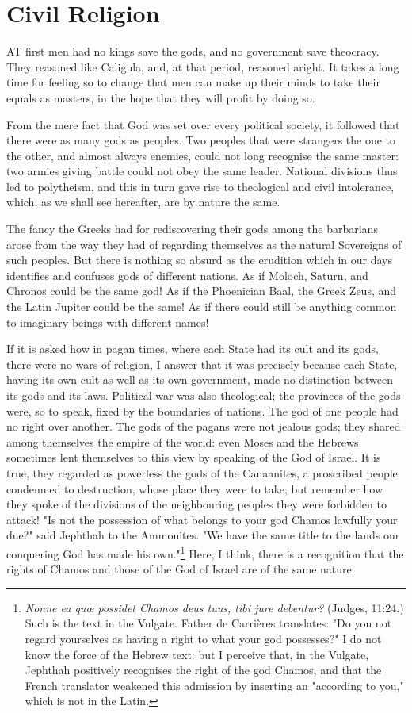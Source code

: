 \documentclass[12pt]{book}
\begin{document}
\section{Civil Religion}
AT first men had no kings save the gods, and no government save theocracy. They reasoned like Caligula, and, at that period, reasoned aright. It takes a long time for feeling so to change that men can make up their minds to take their equals as masters, in the hope that they will profit by doing so.

From the mere fact that God was set over every political society, it followed that there were as many gods as peoples. Two peoples that were strangers the one to the other, and almost always enemies, could not long recognise the same master: two armies giving battle could not obey the same leader. National divisions thus led to polytheism, and this in turn gave rise to theological and civil intolerance, which, as we shall see hereafter, are by nature the same.

The fancy the Greeks had for rediscovering their gods among the barbarians arose from the way they had of regarding themselves as the natural Sovereigns of such peoples. But there is nothing so absurd as the erudition which in our days identifies and confuses gods of different nations. As if Moloch, Saturn, and Chronos could be the same god! As if the Phoenician Baal, the Greek Zeus, and the Latin Jupiter could be the same! As if there could still be anything common to imaginary beings with different names!

If it is asked how in pagan times, where each State had its cult and its gods, there were no wars of religion, I answer that it was precisely because each State, having its own cult as well as its own government, made no distinction between its gods and its laws. Political war was also theological; the provinces of the gods were, so to speak, fixed by the boundaries of nations. The god of one people had no right over another. The gods of the pagans were not jealous gods; they shared among themselves the empire of the world: even Moses and the Hebrews sometimes lent themselves to this view by speaking of the God of Israel. It is true, they regarded as powerless the gods of the Canaanites, a proscribed people condemned to destruction, whose place they were to take; but remember how they spoke of the divisions of the neighbouring peoples they were forbidden to attack! "Is not the possession of what belongs to your god Chamos lawfully your due?" said Jephthah to the Ammonites. "We have the same title to the lands our conquering God has made his own."\footnote{\textit{Nonne ea quœ possidet Chamos deus tuus, tibi jure debentur?} (Judges, 11:24.) Such is the text in the Vulgate. Father de Carrières translates: "Do you not regard yourselves as having a right to what your god possesses?" I do not know the force of the Hebrew text: but I perceive that, in the Vulgate, Jephthah positively recognises the right of the god Chamos, and that the French translator weakened this admission by inserting an "according to you," which is not in the Latin.} Here, I think, there is a recognition that the rights of Chamos and those of the God of Israel are of the same nature.
\end{document}
